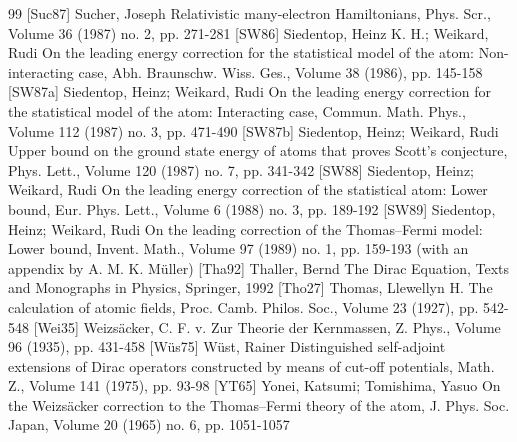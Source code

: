\documentclass[10pt]{amsart}
\theoremstyle{definition}
\begin{document}
\begin{thebibliography}{99}
 [Suc87] Sucher, Joseph Relativistic many-electron Hamiltonians, Phys. Scr., Volume 36 (1987) no. 2, pp. 271-281
 [SW86] Siedentop, Heinz K. H.; Weikard, Rudi On the leading energy correction for the statistical model of the atom: Non-interacting case, Abh. Braunschw. Wiss. Ges., Volume 38 (1986), pp. 145-158
 [SW87a] Siedentop, Heinz; Weikard, Rudi On the leading energy correction for the statistical model of the atom: Interacting case, Commun. Math. Phys., Volume 112 (1987) no. 3, pp. 471-490
 [SW87b] Siedentop, Heinz; Weikard, Rudi Upper bound on the ground state energy of atoms that proves Scott’s conjecture, Phys. Lett., Volume 120 (1987) no. 7, pp. 341-342
 [SW88] Siedentop, Heinz; Weikard, Rudi On the leading energy correction of the statistical atom: Lower bound, Eur. Phys. Lett., Volume 6 (1988) no. 3, pp. 189-192
 [SW89] Siedentop, Heinz; Weikard, Rudi On the leading correction of the Thomas–Fermi model: Lower bound, Invent. Math., Volume 97 (1989) no. 1, pp. 159-193 (with an appendix by A. M. K. Müller)
 [Tha92] Thaller, Bernd The Dirac Equation, Texts and Monographs in Physics, Springer, 1992
 [Tho27] Thomas, Llewellyn H. The calculation of atomic fields, Proc. Camb. Philos. Soc., Volume 23 (1927), pp. 542-548
 [Wei35] Weizsäcker, C. F. v. Zur Theorie der Kernmassen, Z. Phys., Volume 96 (1935), pp. 431-458
 [Wüs75] Wüst, Rainer Distinguished self-adjoint extensions of Dirac operators constructed by means of cut-off potentials, Math. Z., Volume 141 (1975), pp. 93-98
 [YT65] Yonei, Katsumi; Tomishima, Yasuo On the Weizsäcker correction to the Thomas–Fermi theory of the atom, J. Phys. Soc. Japan, Volume 20 (1965) no. 6, pp. 1051-1057
\end{thebibliography}
\end{document}
